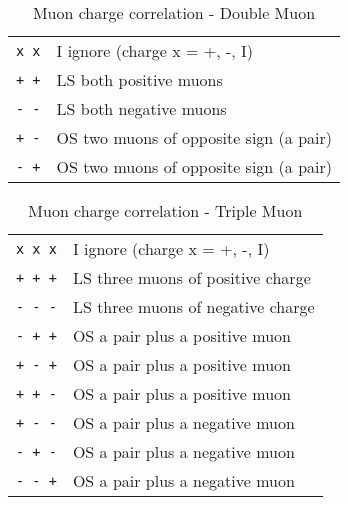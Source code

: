 \begin{table}[ht]
\caption{Muon charge correlation - Double Muon}
\vspace{5mm}
\centering
\begin{tabular}{|c|l|}\hline
\verb|x x| & I ignore (charge x = +, -, I) \\
\verb|+ +| & LS both positive muons \\
\verb|- -| & LS both negative muons \\
\verb|+ -| & OS two muons of opposite sign (a pair) \\
\verb|- +| & OS two muons of opposite sign (a pair) \\\hline
\end{tabular}
\label{tab:gtl:muon_charge_corr_double}
\end{table}


\begin{table}[ht]
\caption{Muon charge correlation - Triple Muon}
\vspace{5mm}
\centering
\begin{tabular}{|c|l|}\hline
\verb|x x x| & I  ignore (charge x = +, -, I) \\
\verb|+ + +| & LS three muons of positive charge \\
\verb|- - -| & LS three muons of negative charge \\
\verb|- + +| & OS a pair plus a positive muon \\
\verb|+ - +| & OS a pair plus a positive muon \\
\verb|+ + -| & OS a pair plus a positive muon \\
\verb|+ - -| & OS a pair plus a negative muon \\
\verb|- + -| & OS a pair plus a negative muon \\
\verb|- - +| & OS a pair plus a negative muon \\\hline
\end{tabular}
\label{tab:gtl:muon_charge_corr_triple}
\end{table}

